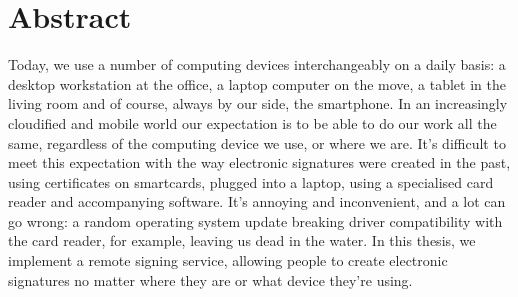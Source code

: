 \chapter*{Abstract}
\label{chap:managementSummary}


Today, we use a number of computing devices interchangeably on a daily basis: a desktop workstation at the office,
a laptop computer on the move, a tablet in the living room and of course, always by our side, the smartphone.
In an increasingly cloudified and mobile world our expectation is to be able to do our work all the same,
regardless of the computing device we use, or where we are.
It's difficult to meet this expectation with the way electronic signatures were created in the past,
using certificates on smartcards, plugged into a laptop, using a specialised card reader and accompanying software.
It's annoying and inconvenient, and a lot can go wrong:
a random operating system update breaking driver compatibility with the card reader, for example,
leaving us dead in the water.
In this thesis, we implement a remote signing service, allowing people to create electronic signatures no matter
where they are or what device they're using.

